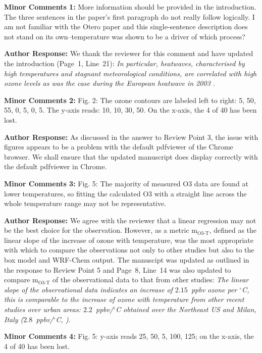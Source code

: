 \documentclass{article}
\DeclareRobustCommand*\degree{\ensuremath{^{\circ}}}
\begin{document}
\textbf{Minor Comments 1:}  More information should be provided in the introduction. The three sentences in the paper’s first paragraph do not really follow logically. I am not familiar with the Otero paper and this single-sentence description does not stand on its own–temperature was shown to be a driver of which process?

\textbf{Author Response:} We thank the reviewer for this comment and have updated the introduction (Page~1, Line~21):
\textit{
In particular, heatwaves, characterised by high temperatures and stagnant meteorological conditions, are correlated with high ozone levels as was the case during the European heatwave in 2003 \citep{Solberg:2008, Vautard:2005}.
}

\textbf{Minor Comments 2:} Fig. 2: The ozone contours are labeled left to right: 5, 50, 55, 0, 5, 0, 5. The y-axis reads: 10, 10, 30, 50. On the x-axis, the 4 of 40 has been lost.

\textbf{Author Response:} As discussed in the answer to Review Point 3, the issue with figures appears to be a problem with the default pdfviewer of the Chrome browser. We shall ensure that the updated manuscript does display correctly with the default pdfviewer in Chrome.

\textbf{Minor Comments 3:} Fig. 5: The majority of measured O3 data are found at lower temperatures, so fitting the calculated O3 with a straight line across the whole temperature range may not be representative.

\textbf{Author Response:} We agree with the reviewer that a linear regression may not be the best choice for the observation. However, as a metric m$_{\text{O3-T}}$, defined as the linear slope of the increase of ozone with temperature, was the most appropriate with which to compare the observations not only to other studies but also to the box model and WRF-Chem output. The manuscipt was updated as outlined in the response to Review Point 5 and Page~8, Line~14 was also updated to compare m$_{\text{O3-T}}$ of the observational data to that from other studies:
\textit{
The linear slope of the observational data indicates an increase of $2.15$~ppbv ozone per \degree C, this is comparable to the increase of ozone with temperature from other recent studies over urban areas: $2.2$~ppbv/\degree C obtained over the Northeast US \citep{Rasmussen:2013} and Milan, Italy ($2.8$~ppbv/\degree C, \citet{Baertsch-Ritter:2004}).
}

\textbf{Minor Comments 4:} Fig. 5: y-axis reads 25, 50, 5, 100, 125; on the x-axis, the 4 of 40 has been lost.
\end{document}
